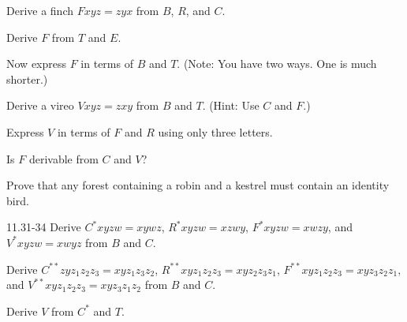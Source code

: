 \documentclass[12pt, letterpaper]{article}
\begin{document}
\begin{prob}{11.24}
Derive a finch $Fxyz = zyx$ from $B$, $R$, and $C$.
\end{prob}

\begin{prob}{11.25}
Derive $F$ from $T$ and $E$.
\end{prob}

\begin{prob}{11.26}
Now express $F$ in terms of $B$ and $T$. (Note: You have two ways. One is much shorter.)
\end{prob}

\begin{prob}{11.27}
Derive a vireo $Vxyz = zxy$ from $B$ and $T$. (Hint: Use $C$ and $F$.)
\end{prob}

\begin{prob}{11.28}
Express $V$ in terms of $F$ and $R$ using only three letters.
\end{prob}

\begin{prob}{11.29}
Is $F$ derivable from $C$ and $V$?
\end{prob}

\begin{prob}{11.30}
Prove that any forest containing a robin and a kestrel must contain an identity bird.
\end{prob}

\begin{prob}{11.31-34}
Derive $C^*xyzw = xywz$, $R^*xyzw = xzwy$, $F^*xyzw = xwzy$, and $V^*xyzw = xwyz$ from $B$ and $C$.
\end{prob}

\begin{prob}{11.35}
Derive $C^{**}zyz_1z_2z_3 = xyz_1z_3z_2$, $R^{**}xyz_1z_2z_3 = xyz_2z_3z_1$, $F^{**}xyz_1z_2z_3 = xyz_3z_2z_1,$ and $V^{**}xyz_1z_2z_3 = xyz_3z_1z_2$ from $B$ and $C$.
\end{prob}

\begin{prob}{11.36}
Derive $V$ from $C^*$ and $T$.
\end{prob}
\end{document}
